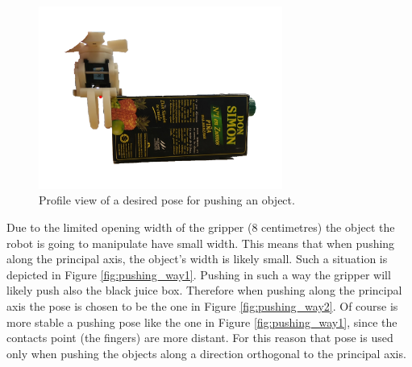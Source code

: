 \begin{figure}[h]
\centering
\includegraphics[width=8cm]{Img/pushing/pushing1.png}
\caption{Profile view of a desired pose for pushing an object.}\label{fig:pushing_pose}
\end{figure}

Due to the limited opening width of the gripper (8 centimetres) the object the robot is going to manipulate have small width. This means that when pushing along the principal axis, the object's width is likely small. Such a situation is depicted in Figure \ref{fig:pushing_way1}. Pushing in such a way the gripper will likely push also the black juice box. Therefore when pushing along the principal axis the pose is chosen to be the one in Figure \ref{fig:pushing_way2}. Of course is more stable a pushing pose like the one in Figure \ref{fig:pushing_way1}, since the contacts point (the fingers) are more distant. For this reason that pose is used only when pushing the objects along a direction orthogonal to the principal axis. 


